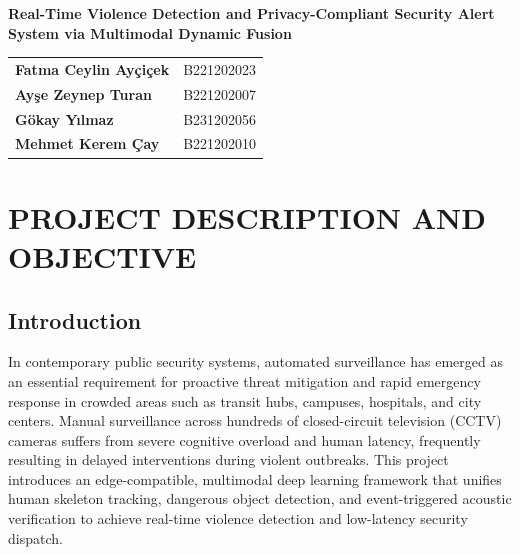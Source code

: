 \documentclass[11pt,a4paper]{article}
\begin{document}
	
	\begin{center}
		{\Large \textbf{Real-Time Violence Detection and Privacy-Compliant Security Alert System via Multimodal Dynamic Fusion}\par}
	\end{center}
	
	\vspace{0.8em}
	
	{\normalsize
		\begin{tabular}{@{}ll}
			\textbf{Fatma Ceylin Ayçiçek} & B221202023 \\ %
			\textbf{Ayşe Zeynep Turan}   & B221202007 \\ %
			\textbf{Gökay Yılmaz}         & B231202056 \\ %
			\textbf{Mehmet Kerem Çay}     & B221202010    %
		\end{tabular}
		\par}
	
	\vspace{1.2em}
	
	\section{PROJECT DESCRIPTION AND OBJECTIVE}
	
	\subsection{Introduction}
	In contemporary public security systems, automated surveillance has emerged as an essential requirement for proactive threat mitigation and rapid emergency response in crowded areas such as transit hubs, campuses, hospitals, and city centers. Manual surveillance across hundreds of closed-circuit television (CCTV) cameras suffers from severe cognitive overload and human latency, frequently resulting in delayed interventions during violent outbreaks. This project introduces an edge-compatible, multimodal deep learning framework that unifies human skeleton tracking, dangerous object detection, and event-triggered acoustic verification to achieve real-time violence detection and low-latency security dispatch.
	
\end{document}
